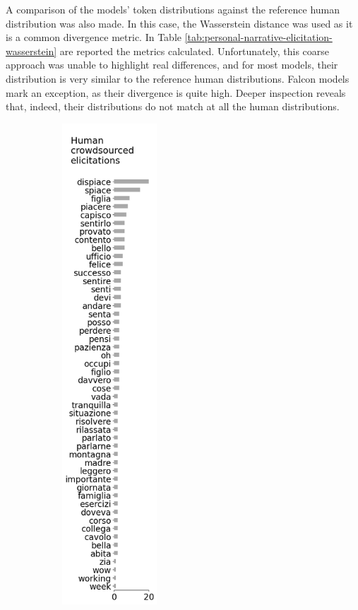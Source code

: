

A comparison of the models' token distributions against the reference human distribution was also made. In this case, the Wasserstein distance \cite{wasserstein} was used as it is a common divergence metric. In Table \ref{tab:personal-narrative-elicitation-wasserstein} are reported the metrics calculated. Unfortunately, this coarse approach was unable to highlight real differences, and for most models, their distribution is very similar to the reference human distributions. Falcon models mark an exception, as their divergence is quite high. Deeper inspection reveals that, indeed, their distributions do not match at all the human distributions. 
\begin{figure}[!htbp]
    \centering
    \begin{subfigure}[t]{0.25\textwidth}
        \centering
        \includegraphics[height=18cm]{assets/imgs/dataset-test-set-top-50-answers-vertical.png}

\end{subfigure}
\end{figure}
